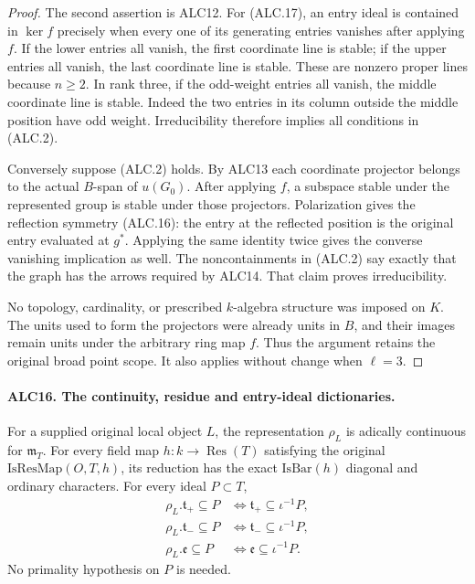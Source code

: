 \begin{proof}
The second assertion is ALC12.  For (ALC.17), an entry ideal
is contained in \(\ker f\) precisely when every one of
its generating entries vanishes after applying \(f\).
If the lower entries all vanish, the first coordinate line
is stable; if the upper entries all vanish, the last
coordinate line is stable.  These are nonzero proper lines
because \(n\ge2\).  In rank three, if the odd-weight
entries all vanish, the middle coordinate line is stable.
Indeed the two entries in its column outside the middle
position have odd weight.  Irreducibility therefore implies
all conditions in (ALC.2).

Conversely suppose (ALC.2) holds.  By ALC13 each coordinate
projector belongs to the actual \(B\)-span of \(u(G_0)\).
After applying \(f\), a subspace stable under the represented
group is stable under those projectors.  Polarization gives
the reflection symmetry (ALC.16): the entry at the reflected
position is the original entry evaluated at \(g^*\).
Applying the same identity twice gives the converse vanishing
implication as well.  The noncontainments in (ALC.2) say
exactly that the graph has the arrows required by ALC14.
That claim proves irreducibility.

No topology, cardinality, or prescribed \(k\)-algebra
structure was imposed on \(K\).  The units used to form
the projectors were already units in \(B\), and their
images remain units under the arbitrary ring map \(f\).
Thus the argument retains the original broad point scope.
It also applies without change when \(\ell=3\).
\end{proof}

\paragraph{ALC16. The continuity, residue and entry-ideal dictionaries.}
\label{claim:ALC16}
For a supplied original local object \(L\), the representation
\(\rho_L\) is adically continuous for \(\mathfrak m_T\).
For every field map \(h:k\to\operatorname{Res}(T)\)
satisfying the original \(\mathrm{IsResMap}(O,T,h)\), its
reduction has the exact \(\mathrm{IsBar}(h)\) diagonal and
ordinary characters.  For every ideal \(P\subset T\),
\[
 \begin{aligned}
 \rho_L.\mathfrak t_+\subseteq P
       &\Longleftrightarrow \mathfrak t_+\subseteq\iota^{-1}P,\\
 \rho_L.\mathfrak t_-\subseteq P
       &\Longleftrightarrow \mathfrak t_-\subseteq\iota^{-1}P,\\
 \rho_L.\mathfrak e\subseteq P
       &\Longleftrightarrow \mathfrak e\subseteq\iota^{-1}P.
 \end{aligned}                                             \tag{ALC.18}
\]
No primality hypothesis on \(P\) is needed.

